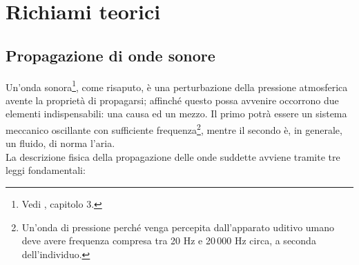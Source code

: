 \chapter{Richiami teorici}
\label{sec:appendix}


\section{Propagazione di onde sonore}
\label{sec:wavesprop}

Un'onda sonora\footnote{ Vedi \cite{amea}, capitolo 3.}, come risaputo, \`e una 
perturbazione della pressione atmosferica 
avente la propriet\`a di propagarsi; affinch\'e questo possa avvenire occorrono
due elementi indispensabili: una causa ed un mezzo. Il primo potr\`a essere un
sistema meccanico oscillante con sufficiente 
frequenza\footnote{ Un'onda di pressione
   perch\'e venga percepita dall'apparato uditivo umano deve avere frequenza compresa
   tra 20 Hz e 20\,000 Hz circa, a seconda dell'individuo.}, mentre il secondo \`e,
in generale, un fluido, di norma l'aria.\\
La descrizione fisica della propagazione delle onde suddette avviene tramite tre
leggi fondamentali:

